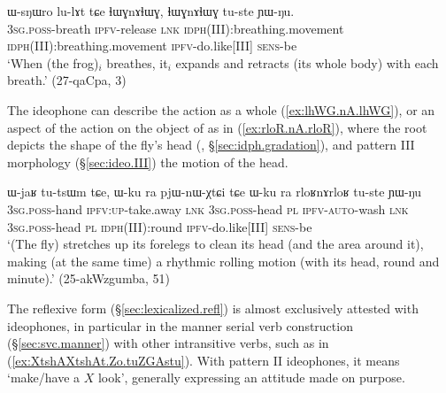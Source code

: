 \begin{exe}
\ex \label{ex:lhWG.nA.lhWG}
\gll ɯ-sŋɯro lu-lɤt tɕe ɬɯɣnɤɬɯɣ, ɬɯɣnɤɬɯɣ tu-ste ɲɯ-ŋu.\\
\textsc{3sg}.\textsc{poss}-breath \textsc{ipfv}-release \textsc{lnk} \textsc{idph}(III):breathing.movement \textsc{idph}(III):breathing.movement \textsc{ipfv}-do.like[III] \textsc{sens}-be \\
\glt `When (the frog)$_i$ breathes, it$_i$ expands and retracts (its whole body) with each breath.' (27-qaCpa, 3)
\end{exe}

The ideophone can describe the action as a whole (\ref{ex:lhWG.nA.lhWG}), or an aspect of the action on the object of  as in (\ref{ex:rloR.nA.rloR}), where the root    depicts the shape of the fly's head (, §\ref{sec:idph.gradation}), and pattern III morphology (§\ref{sec:ideo.III}) the motion of the head.

\begin{exe}
\ex \label{ex:rloR.nA.rloR}
\gll ɯ-jaʁ tu-tsɯm tɕe, ɯ-ku ra pjɯ-nɯ-χtɕi tɕe ɯ-ku ra rloʁnɤrloʁ tu-ste ɲɯ-ŋu \\
\textsc{3sg}.\textsc{poss}-hand \textsc{ipfv}:\textsc{up}-take.away \textsc{lnk} \textsc{3sg}.\textsc{poss}-head \textsc{pl} \textsc{ipfv}-\textsc{auto}-wash \textsc{lnk} \textsc{3sg}.\textsc{poss}-head \textsc{pl}  \textsc{idph}(III):round  \textsc{ipfv}-do.like[III] \textsc{sens}-be \\ 
\glt `(The fly) stretches up its forelegs to clean its head (and the area around it), making (at the same time) a rhythmic rolling motion (with its head, round and minute).' (25-akWzgumba, 51)
\end{exe}

The reflexive form  (§\ref{sec:lexicalized.refl}) is almost exclusively attested with ideophones, in particular in the manner serial verb construction (§\ref{sec:svc.manner}) with other intransitive verbs, such as  in (\ref{ex:XtshAXtshAt.Zo.tuZGAstu}). With pattern II ideophones, it means `make/have a $X$ look', generally expressing an attitude made on purpose.

